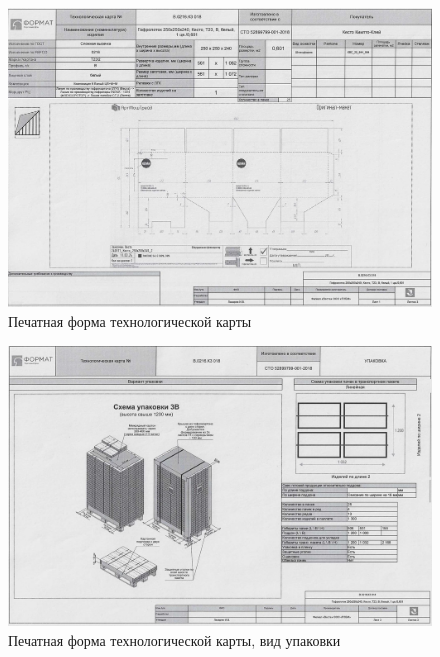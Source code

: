 \begin{figure}
\begin{center}
 \includegraphics[height=0.4\textheight, keepaspectratio]{Pics/II.5.4..jpg}
\end{center}
 \caption{Печатная форма технологической карты}
 \label{pic:II.5.4.}
\end{figure}

\begin{figure}
\begin{center}
 \includegraphics[height=0.4\textheight, keepaspectratio]{Pics/II.5.4.jpg}
\end{center}
 \caption{Печатная форма технологической карты, вид упаковки}
 \label{pic:II.5.4}
\end{figure}

